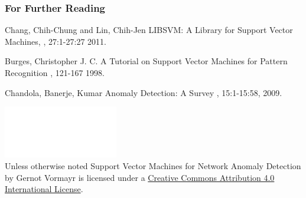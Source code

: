 \documentclass{beamer}
\begin{document}
\begin{frame}[allowframebreaks]
    \frametitle<presentation>{For Further Reading}
    
    \begin{thebibliography}{10}
    
    \beamertemplatearticlebibitems
       Chang, Chih-Chung and Lin, Chih-Jen
       \newblock LIBSVM: A Library for Support Vector Machines,
       , 27:1-27:27
       2011.

       Burges, Christopher J. C.
       \newblock A Tutorial on Support Vector Machines for Pattern Recognition
       , 121-167
       1998.

    Chandola, Banerje, Kumar
    \newblock Anomaly Detection: A Survey
    , 15:1-15:58,
    2009.

  \end{thebibliography}
\end{frame}

\bgroup

\begin{frame}[plain]
\begin{center}
    \includegraphics[width=5cm]{pics/By.eps}\\
    \vspace{2cm}
    \color{white}
    Unless otherwise noted Support Vector Machines for Network Anomaly Detection by
    Gernot Vormayr is licensed under a
    \href{http://creativecommons.org/licenses/by/4.0/}{Creative Commons Attribution 4.0 International License}.
\end{center}
\end{frame}

\egroup
\end{document}
